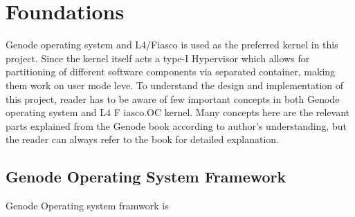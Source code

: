 \chapter{ Foundations}
Genode operating system and L4/Fiasco is used as the preferred kernel in this project.
Since the kernel itself acts a type-I Hypervisor which allows for partitioning of different
software components via separated container, making them work on user mode leve.
To understand the design and implementation of this project, reader has to be aware of few important concepts in both Genode operating system and L4 F
iasco.OC kernel. Many concepts here are the relevant parts explained from the Genode book 
according to author's understanding, but the reader can always refer to the book for detailed explanation.

\section{Genode Operating System Framework}
Genode Operating system framwork is

